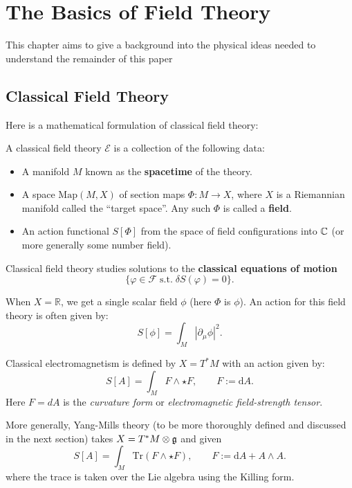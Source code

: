 \chapter{The Basics of Field Theory\label{ch:phys}}

	This chapter aims to give a background into the physical ideas needed to understand the remainder of this paper
	
	\section{Classical Field Theory} %
	\label{sec:classical_field_theory}
	
	
	
	Here is a mathematical formulation of classical field theory:
	\begin{defn}
		A classical field theory $\mathcal E$ is a collection of the following data:
		\begin{itemize}
			\item A manifold $M$ known as the \textbf{spacetime} of the theory.
			\item A space $\mathrm{Map}(M, X)$ of section maps $\Phi: M \to X$, where $X$ is a Riemannian manifold called the ``target space''. Any such $\Phi$ is called a \textbf{field}.
			\item An action functional $S[\Phi]$ from the space of field configurations into $\mathbb{C}$ (or more generally some number field).
		\end{itemize}
		Classical field theory studies solutions to the \textbf{classical equations of motion}
		$$\{\varphi \in \mathcal F \; \text{s.t.} \; \delta S(\varphi) = 0 \}.$$
	\end{defn}
	\begin{eg}
		When $X = \mathbb R$, we get a single scalar field $\phi$ (here $\Phi$ is $\phi$). An action for this field theory is often given by:
		$$S[\phi] = \int_M |\partial_\mu \phi|^2.$$
	\end{eg}
	\begin{eg}
		Classical electromagnetism is defined by $X=T^* M$ with an action given by:
		$$S[A] = \int_M F \wedge \star F, \qquad F := \mathrm dA.$$
		Here $F = dA$ is the \emph{curvature form} or \emph{electromagnetic field-strength tensor}.
		
		More generally, Yang-Mills theory (to be more thoroughly defined and discussed in the next section) takes $X=T^* M \otimes \frak g$ and given 
		$$S[A] = \int_M \mathrm{Tr}\left( F \wedge \star F \right), \qquad F := \mathrm dA + A \wedge A.$$
		where the trace is taken over the Lie algebra using the Killing form. 
	\end{eg}
	
